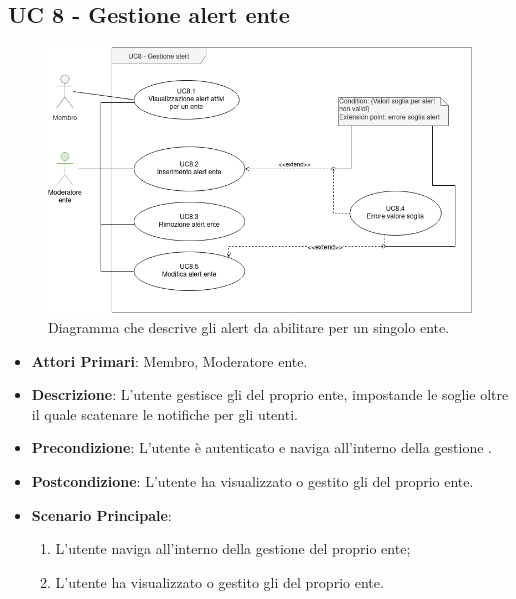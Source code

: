 	\subsection{UC 8 - Gestione alert ente}
		
		\begin{figure}[H]
			\centering
			\includegraphics[scale=0.60]{res/images/uc8}
			\caption{Diagramma che descrive gli alert da abilitare per un singolo ente.}
		\end{figure}

		\begin{itemize}
			\item \textbf{Attori Primari}: Membro, Moderatore ente.
			\item \textbf{Descrizione}: L'utente gestisce gli  del proprio ente, impostande le soglie oltre il quale scatenare le notifiche per gli utenti.
			\item \textbf{Precondizione}: L'utente è autenticato e naviga all'interno della gestione .
			\item \textbf{Postcondizione}: L'utente ha visualizzato o gestito gli  del proprio ente.
			\item \textbf{Scenario Principale}:
			\begin{enumerate}
				\item{L'utente naviga all'interno della gestione  del proprio ente;}
				\item{L'utente ha visualizzato o gestito gli  del proprio ente.}
			\end{enumerate}	
		\end{itemize}
			
